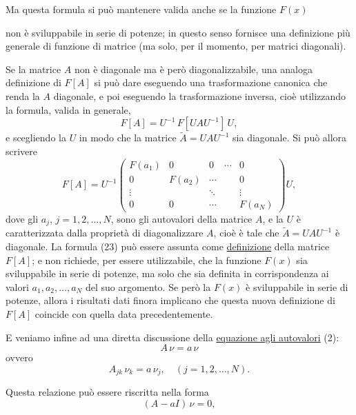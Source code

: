 \documentclass[11pt, a4paper]{book}
\numberwithin{equation}{section}
\begin{document}
Ma questa formula si può mantenere valida anche se la funzione $F(x)$


non è sviluppabile in serie di potenze; in questo senso fornisce una
definizione più generale di funzione di matrice (ma solo, per il momento,
per matrici diagonali).

Se la matrice $A$ non è diagonale ma è però diagonalizzabile, una analoga
definizione di $F[A]$ si può dare eseguendo una trasformazione canonica
che renda la $A$ diagonale, e poi eseguendo la trasformazione inversa,
cioè utilizzando la formula, valida in generale,
\begin{equation}
F[A] = U^{-1}\, F[UAU^{-1}]\, U,
\end{equation}
e scegliendo la $U$ in modo che la matrice $\widetilde{A} = UAU^{-1}$ sia
diagonale. Si può allora scrivere
\begin{equation}
F[A] = U^{-1}
\begin{pmatrix}
F(a_1) & 0      & 0      & \cdots & 0      \\
0      & F(a_2) & \cdots &        & 0      \\
\vdots &        & \ddots &        & \vdots \\
0      & 0      & \cdots &        & F(a_N)
\end{pmatrix}
U,
\end{equation}
dove gli $a_j$, $j = 1, 2, \ldots, N$, sono gli autovalori della matrice
$A$, e la $U$ è caratterizzata dalla proprietà di diagonalizzare $A$,
cioè è tale che $\widetilde{A} = UAU^{-1}$ è diagonale. La formula (23)
può essere assunta come \underline{definizione} della matrice $F[A]$; e
non richiede, per essere utilizzabile, che la funzione $F(x)$ sia
sviluppabile in serie di potenze, ma solo che sia definita in
corrispondenza ai valori $a_1, a_2, \ldots, a_N$ del suo argomento. Se
però la $F(x)$ è sviluppabile in serie di potenze, allora i risultati dati
finora implicano che questa nuova definizione di $F[A]$ coincide con
quella data precedentemente.

E veniamo infine ad una diretta discussione della \underline{equazione
agli autovalori} (2):
\[
A\,\nu = a\,\nu
\]
ovvero
\begin{equation}
A_{jk}\,\nu_k = a\,\nu_j, \quad (j = 1, 2, \ldots, N).
\end{equation}

Questa relazione può essere riscritta nella forma
\begin{equation}
(A - aI)\,\nu = 0, \tag{25a}
\end{equation}
\end{document}
